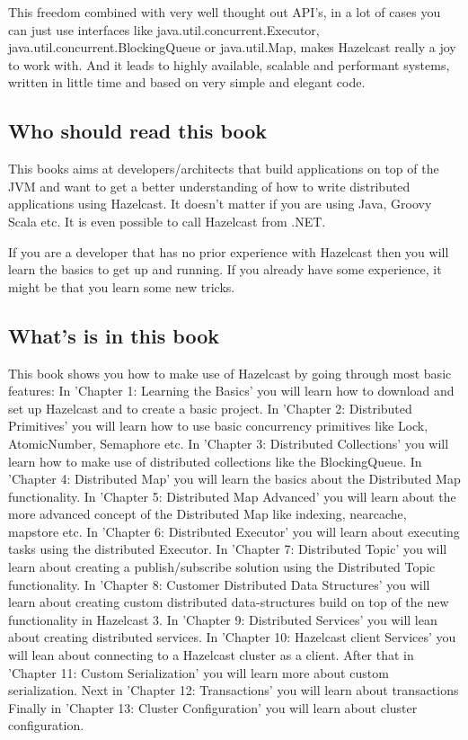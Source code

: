 This freedom combined with very well thought out API's, in a lot of cases you can just use interfaces like java.util.concurrent.Executor, java.util.concurrent.BlockingQueue or java.util.Map, makes Hazelcast really a joy to work with. And it leads to highly available, scalable and performant systems, written in little time and based on very simple and elegant code.

\subsection*{Who should read this book}
This books aims at developers/architects that build applications on top of the JVM and want to get a better understanding of how to write distributed applications using Hazelcast. It doesn't matter if you are using Java, Groovy Scala etc. It is even possible to call Hazelcast from .NET.

If you are a developer that has no prior experience with Hazelcast then you will learn the basics to get up and running. If you already have some experience, it might be that you learn some new tricks.

\subsection*{What's is in this book}
This book shows you how to make use of Hazelcast by going through most basic features:
In 'Chapter 1: Learning the Basics' you will learn how to download and set up Hazelcast and to create a basic project.
In 'Chapter 2: Distributed Primitives' you will learn how to use basic concurrency primitives like Lock, AtomicNumber, Semaphore etc.
In 'Chapter 3: Distributed Collections' you will learn how to make use of distributed collections like the BlockingQueue.
In 'Chapter 4: Distributed Map' you will learn the basics about the Distributed Map functionality.
In 'Chapter 5: Distributed Map Advanced' you will learn about the more advanced concept of the Distributed Map like indexing, nearcache, mapstore etc.
In 'Chapter 6: Distributed Executor' you will learn about executing tasks using the distributed Executor.
In 'Chapter 7: Distributed Topic' you will learn about creating a publish/subscribe solution using the Distributed Topic functionality.
In 'Chapter 8: Customer Distributed Data Structures' you will learn about creating custom distributed data-structures build on top of the new functionality in Hazelcast 3.
In 'Chapter 9: Distributed Services' you will lean about creating distributed services.
In 'Chapter 10: Hazelcast client Services' you will lean about connecting to a Hazelcast cluster as a client.
After that in  'Chapter 11: Custom Serialization' you will learn more about custom serialization.  
Next in 'Chapter 12: Transactions' you will learn about transactions
Finally in 'Chapter 13: Cluster Configuration' you will learn about cluster configuration.

